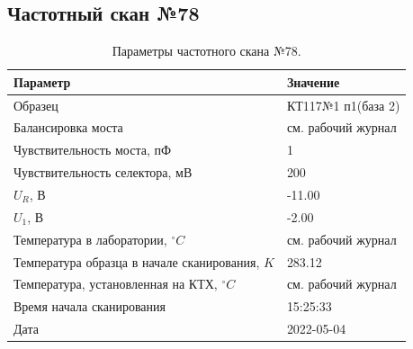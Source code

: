 \subsection{Частотный скан №78}
\begin{table}[!ht]
    \centering
    \caption{Параметры частотного скана №78.}
    \begin{tabular}{|l|l|}
        \hline
        Параметр                                       & Значение                  \\ \hline
        Образец                                        & КТ117№1 п1(база 2)        \\ \hline
        Балансировка моста                             & см. рабочий журнал        \\ \hline
        Чувствительность моста, пФ                     & 1                         \\ \hline
        Чувствительность селектора, мВ                 & 200                       \\ \hline
        $U_R$, В                                       & -11.00                    \\ \hline
        $U_1$, В                                       & -2.00                     \\ \hline
        Температура в лаборатории, $^\circ C$          & см. рабочий журнал        \\ \hline
        Температура образца в начале сканирования, $K$ & 283.12                    \\ \hline
        Температура, установленная на КТХ, $^\circ C$  & см. рабочий журнал        \\ \hline
        Время начала сканирования                      & 15:25:33                  \\ \hline
        Дата                                           & 2022-05-04                \\ \hline
    \end{tabular}
    \label{table:frequency_scan_78}
\end{table}

